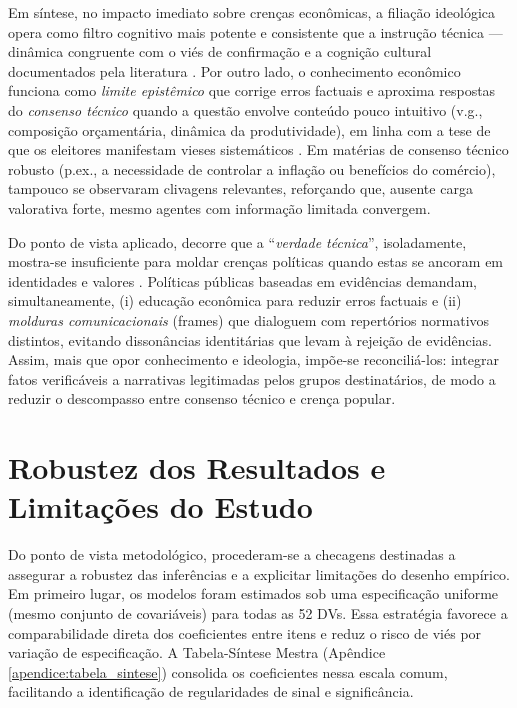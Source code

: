 Em síntese, no impacto imediato sobre crenças econômicas, a filiação ideológica opera como filtro cognitivo mais potente e consistente que a instrução técnica --- dinâmica congruente com o viés de confirmação e a cognição cultural documentados pela literatura \cite{kahneman2011thinking, kahan2012polarization}. Por outro lado, o conhecimento econômico funciona como \textit{limite epistêmico} que corrige erros factuais e aproxima respostas do \textit{consenso técnico} quando a questão envolve conteúdo pouco intuitivo (v.g., composição orçamentária, dinâmica da produtividade), em linha com a tese de que os eleitores manifestam vieses sistemáticos \cite{The_Myth_of_the_Rational_Voter}. Em matérias de consenso técnico robusto (p.ex., a necessidade de controlar a inflação ou benefícios do comércio), tampouco se observaram clivagens relevantes, reforçando que, ausente carga valorativa forte, mesmo agentes com informação limitada convergem.

Do ponto de vista aplicado, decorre que a ``\textit{verdade técnica}'', isoladamente, mostra-se insuficiente para moldar crenças políticas quando estas se ancoram em identidades e valores \cite{westen2007political}. Políticas públicas baseadas em evidências demandam, simultaneamente, (i) educação econômica para reduzir erros factuais e (ii) \textit{molduras comunicacionais} (frames) que dialoguem com repertórios normativos distintos, evitando dissonâncias identitárias que levam à rejeição de evidências. Assim, mais que opor conhecimento e ideologia, impõe-se reconciliá-los: integrar fatos verificáveis a narrativas legitimadas pelos grupos destinatários, de modo a reduzir o descompasso entre consenso técnico e crença popular.

\section{Robustez dos Resultados e Limitações do Estudo}
\label{sec:limitacao_robustez}
Do ponto de vista metodológico, procederam-se a checagens destinadas a assegurar a robustez das inferências e a explicitar limitações do desenho empírico. Em primeiro lugar, os modelos foram estimados sob uma especificação uniforme (mesmo conjunto de covariáveis) para todas as 52 DVs. Essa estratégia favorece a comparabilidade direta dos coeficientes entre itens e reduz o risco de viés por variação de especificação. A Tabela-Síntese Mestra (Apêndice \autoref{apendice:tabela_sintese}) consolida os coeficientes nessa escala comum, facilitando a identificação de regularidades de sinal e significância.


